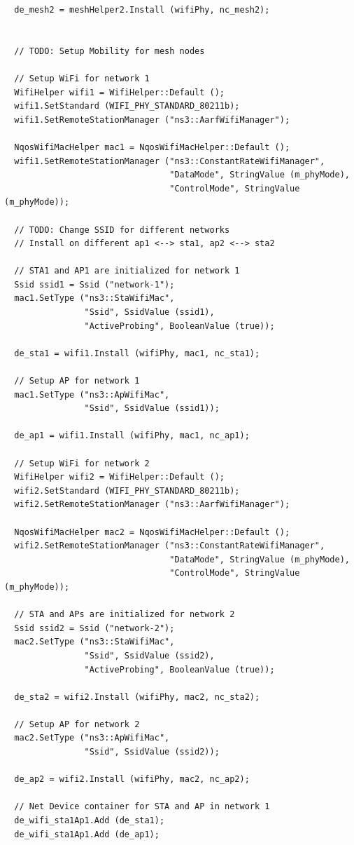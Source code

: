 \documentclass[12pt,a4paper]{report}
\begin{document}
\begin{verbatim}
  de_mesh2 = meshHelper2.Install (wifiPhy, nc_mesh2);


  // TODO: Setup Mobility for mesh nodes

  // Setup WiFi for network 1
  WifiHelper wifi1 = WifiHelper::Default ();
  wifi1.SetStandard (WIFI_PHY_STANDARD_80211b);
  wifi1.SetRemoteStationManager ("ns3::AarfWifiManager");

  NqosWifiMacHelper mac1 = NqosWifiMacHelper::Default ();
  wifi1.SetRemoteStationManager ("ns3::ConstantRateWifiManager",
                                 "DataMode", StringValue (m_phyMode),
                                 "ControlMode", StringValue (m_phyMode));

  // TODO: Change SSID for different networks
  // Install on different ap1 <--> sta1, ap2 <--> sta2

  // STA1 and AP1 are initialized for network 1
  Ssid ssid1 = Ssid ("network-1");
  mac1.SetType ("ns3::StaWifiMac",
                "Ssid", SsidValue (ssid1),
                "ActiveProbing", BooleanValue (true));

  de_sta1 = wifi1.Install (wifiPhy, mac1, nc_sta1);

  // Setup AP for network 1
  mac1.SetType ("ns3::ApWifiMac",
                "Ssid", SsidValue (ssid1));

  de_ap1 = wifi1.Install (wifiPhy, mac1, nc_ap1);

  // Setup WiFi for network 2
  WifiHelper wifi2 = WifiHelper::Default ();
  wifi2.SetStandard (WIFI_PHY_STANDARD_80211b);
  wifi2.SetRemoteStationManager ("ns3::AarfWifiManager");

  NqosWifiMacHelper mac2 = NqosWifiMacHelper::Default ();
  wifi2.SetRemoteStationManager ("ns3::ConstantRateWifiManager",
                                 "DataMode", StringValue (m_phyMode),
                                 "ControlMode", StringValue (m_phyMode));

  // STA and APs are initialized for network 2
  Ssid ssid2 = Ssid ("network-2");
  mac2.SetType ("ns3::StaWifiMac",
                "Ssid", SsidValue (ssid2),
                "ActiveProbing", BooleanValue (true));

  de_sta2 = wifi2.Install (wifiPhy, mac2, nc_sta2);

  // Setup AP for network 2
  mac2.SetType ("ns3::ApWifiMac",
                "Ssid", SsidValue (ssid2));

  de_ap2 = wifi2.Install (wifiPhy, mac2, nc_ap2);

  // Net Device container for STA and AP in network 1
  de_wifi_sta1Ap1.Add (de_sta1);
  de_wifi_sta1Ap1.Add (de_ap1);


\end{verbatim}
\end{document}
